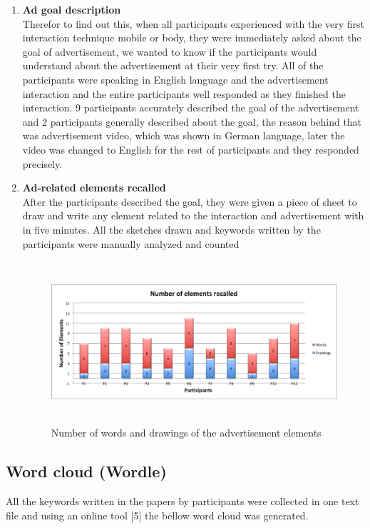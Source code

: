 \begin{enumerate}

\item	\textbf{Ad goal description} \\
Therefor to find out this, when all participants experienced with the very first interaction technique mobile or body, they were immediately asked about the goal of advertisement, we wanted to know if the participants would understand about the advertisement at their very first try. All of the participants were speaking in English language and the advertisement interaction and the entire participants well responded as they finished the interaction. 9 participants accurately described the goal of the advertisement and 2 participants generally described about the goal, the reason behind that was advertisement video, which was shown in German language, later the video was changed to English for the rest of participants and they responded precisely.

\item	\textbf{Ad-related elements recalled}  \\ 
After the participants described the goal, they were given a piece of sheet to draw and write any element related to the interaction and advertisement with in five minutes. All the sketches drawn and keywords written by the participants were manually analyzed and counted

\begin{figure}[H]
\centering
\includegraphics[width=12cm,height=6cm]{Figures/6/word_recall}%
 \caption{Number of words and drawings of the advertisement elements }%
 \label{fig:word_recall}%
\end{figure}

\end{enumerate}

\subsection{Word cloud (Wordle)}
All the keywords written in the papers by participants were collected in one text file and using an online tool [5] the bellow word cloud was generated.

